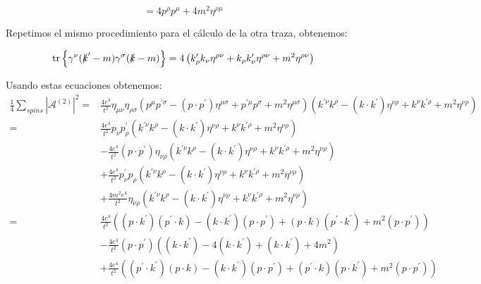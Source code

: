 \begin{equation}
= 4p^\rho p^\mu + 4m^2 \eta^{\rho\mu}
\end{equation}

Repetimos el mismo procedimiento para el cálculo de la otra traza, obtenemos:

\begin{equation}
\text{tr} \left\{ \gamma^\nu (\slashed{k}' - m) \gamma^\sigma (\slashed{k} - m) \right\} = 4 \left( k'_\rho k_\nu \eta^{\rho\nu} + k_\rho k'_\nu \eta^{\rho\nu} + m^2 \eta^{\rho\nu} \right)
\end{equation}


Usando estas ecuaciones obtenemos: 
\begin{equation}
  \begin{aligned}
  \frac{1}{4} \sum_{s p i n s}\left|\mathcal{A}^{(2)}\right|^2= & \frac{4 e^4}{t^2} \eta_{\mu \nu} \eta_{\rho \sigma}\left(p^\mu p^{\prime \sigma}-\left(p \cdot p^{\prime}\right) \eta^{\mu \sigma}+p^{\prime \mu} p^\sigma+m^2 \eta^{\mu \sigma}\right)\left(k^{\prime \nu} k^\rho-\left(k \cdot k^{\prime}\right) \eta^{\nu \rho}+k^\nu k^{\prime \rho}+m^2 \eta^{\nu \rho}\right) \\
  = & \frac{4 e^4}{t^2} p_\nu p_\rho^{\prime}\left(k^{\prime \nu} k^\rho-\left(k \cdot k^{\prime}\right) \eta^{\nu \rho}+k^\nu k^{\prime \rho}+m^2 \eta^{\nu \rho}\right) \\
  & -\frac{4 e^4}{t^2}\left(p \cdot p^{\prime}\right) \eta_{\nu \rho}\left(k^{\prime \nu} k^\rho-\left(k \cdot k^{\prime}\right) \eta^{\nu \rho}+k^\nu k^{\prime \rho}+m^2 \eta^{\nu \rho}\right) \\
  & +\frac{4 e^4}{t^2} p_\nu^{\prime} p_\rho\left(k^{\prime \nu} k^\rho-\left(k \cdot k^{\prime}\right) \eta^{\nu \rho}+k^\nu k^{\prime \rho}+m^2 \eta^{\nu \rho}\right) \\
  & +\frac{4 m^2 e^4}{t^2} \eta_{\nu \rho}\left(k^{\prime \nu} k^\rho-\left(k \cdot k^{\prime}\right) \eta^{\nu \rho}+k^\nu k^{\prime \rho}+m^2 \eta^{\nu \rho}\right) \\
  = & \frac{4 e^4}{t^2}\left(\left(p \cdot k^{\prime}\right)\left(p^{\prime} \cdot k\right)-\left(k \cdot k^{\prime}\right)\left(p \cdot p^{\prime}\right)+(p \cdot k)\left(p^{\prime} \cdot k^{\prime}\right)+m^2\left(p \cdot p^{\prime}\right)\right) \\
  & -\frac{4 e^4}{t^2}\left(p \cdot p^{\prime}\right)\left(\left(k \cdot k^{\prime}\right)-4\left(k \cdot k^{\prime}\right)+\left(k \cdot k^{\prime}\right)+4 m^2\right) \\
  & +\frac{4 e^4}{t^2}\left(\left(p^{\prime} \cdot k^{\prime}\right)(p \cdot k)-\left(k \cdot k^{\prime}\right)\left(p \cdot p^{\prime}\right)+\left(p^{\prime} \cdot k\right)\left(p \cdot k^{\prime}\right)+m^2\left(p \cdot p^{\prime}\right)\right) \\

\end{aligned}
\end{equation}
